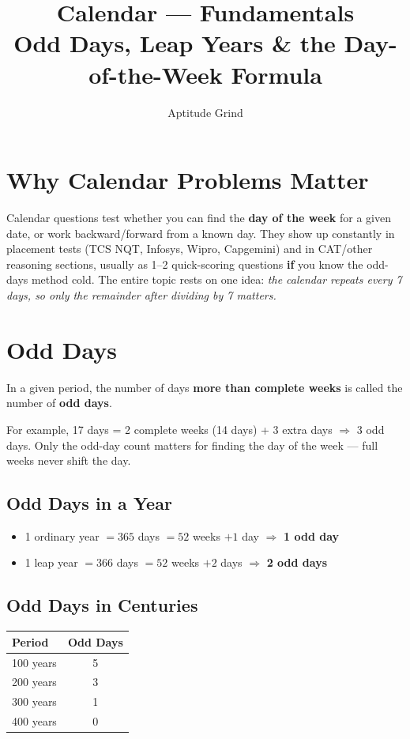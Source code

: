 \documentclass[11pt]{article}
\title{\color{primary}\textbf{Calendar --- Fundamentals}\\[4pt]\large Odd Days, Leap Years \& the Day-of-the-Week Formula}
\author{Aptitude Grind}
\date{}
\begin{document}
\maketitle
\thispagestyle{fancy}

\section*{Why Calendar Problems Matter}
Calendar questions test whether you can find the \textbf{day of the week} for a given date, or work
backward/forward from a known day. They show up constantly in placement tests (TCS NQT, Infosys,
Wipro, Capgemini) and in CAT/other reasoning sections, usually as 1--2 quick-scoring questions
\textbf{if} you know the odd-days method cold. The entire topic rests on one idea: \emph{the calendar
repeats every 7 days, so only the remainder after dividing by 7 matters.}

\section{Odd Days}

\begin{formulabox}[Definition]
In a given period, the number of days \textbf{more than complete weeks} is called the number of
\textbf{odd days}.
\end{formulabox}

For example, 17 days = 2 complete weeks (14 days) + 3 extra days $\Rightarrow$ 3 odd days.
Only the odd-day count matters for finding the day of the week --- full weeks never shift the day.

\subsection{Odd Days in a Year}
\begin{itemize}[leftmargin=1.4em]
  \item 1 ordinary year $= 365$ days $= 52$ weeks $+ 1$ day $\Rightarrow$ \textbf{1 odd day}
  \item 1 leap year $= 366$ days $= 52$ weeks $+ 2$ days $\Rightarrow$ \textbf{2 odd days}
\end{itemize}

\subsection{Odd Days in Centuries}
\begin{formulabox}
\centering
\begin{tabular}{lc}
\toprule
\textbf{Period} & \textbf{Odd Days} \\
\midrule
100 years & 5 \\
200 years & 3 \\
300 years & 1 \\
400 years & 0 \\
\bottomrule
\end{tabular}
\end{formulabox}
\end{document}
